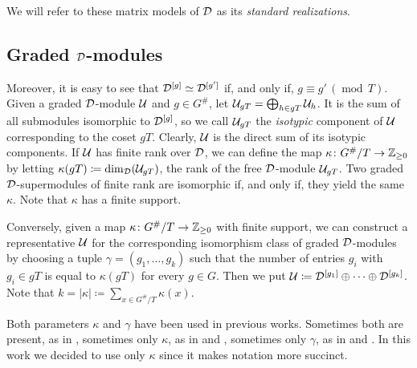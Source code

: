 \begin{defi}
	We will refer to these matrix models of $\mathcal D$ as its \emph{standard realizations}.
\end{defi}


\subsection{Graded $\mathcal{D}$-modules}
Moreover, it is easy to see that $\mathcal{D}^{[g]}\simeq \mathcal{D}^{[g']}$ if, and only if,  $g \equiv g' \,(\operatorname{mod}\, T)$.
Given a graded $\mathcal{D}$-module $\mathcal U$ and $g\in G^\#$, let $\mathcal U_{gT} = \bigoplus_{h \in gT} \mathcal U_{h}$.
It is the sum of all submodules isomorphic to $\mathcal{D}^{[g]}$, so we call $\mathcal U_{gT}$ the \emph{isotypic} component of $\mathcal U$ corresponding to the coset $gT$.
Clearly, $\mathcal U$ is the direct sum of its isotypic components.
If $\mathcal U$ has finite rank over $\mathcal{D}$, we can define the map $\kappa\colon G^\#/T \to \mathbb{Z}_{\geq 0}$ by letting $\kappa (gT) \coloneqq \dim_{\mathcal{D}} (\mathcal U_{gT})$, the rank of the free $\mathcal{D}$-module $\mathcal U_{gT}$.
Two graded $\mathcal{D}$-supermodules of finite rank are isomorphic if, and only if, they yield the same $\kappa$.
Note that $\kappa$ has a finite support.

Conversely, given a map $\kappa\colon G^\#/T \to \mathbb{Z}_{\geq 0}$ with finite support, we can construct a representative $\mathcal U$ for the corresponding isomorphism class of graded $\mathcal{D}$-modules by choosing a tuple $\gamma = (g_1, \ldots, g_k)$ such that the number of entries $g_i$ with $g_i\in gT$ is equal to $\kappa (gT)$ for every $g\in G$.
Then we put $\mathcal U \coloneqq \mathcal{D}^{[g_1]} \oplus \cdots \oplus \mathcal{D}^{[g_k]}$.
Note that $k = |\kappa| \coloneqq \sum_{x\in G^\#/T} \kappa(x)$.

\begin{remark}
	Both parameters $\kappa$ and $\gamma$ have been used in previous works.
	Sometimes both are present, as in \cite{livromicha}, sometimes only $\kappa$, as in \cite{paper-adrian} and \cite{felipe-misha}, sometimes only $\gamma$, as in \cite{paper-Qn} and \cite{paper-MAP}.
	In this work we decided to use only $\kappa$ since it makes notation more succinct.
\end{remark}

